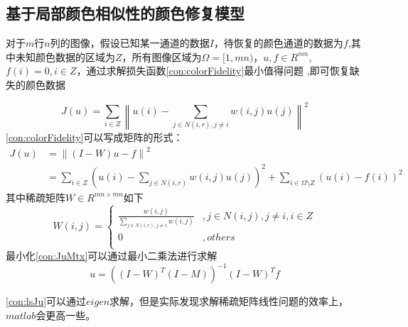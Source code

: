 \documentclass[UTF8]{ctexart}
\begin{document}
\begin{sloppypar}
    \subsection{基于局部颜色相似性的颜色修复模型}
    对于$m$行$n$列的图像，假设已知某一通道的数据$I$，待恢复的颜色通道的数据为$f$,其中未知颜色数据的区域为$Z$，所有图像区域为$\Omega=[1,mn)$，$u,f\in R^{mn}$,$f(i) = 0,i \in Z $，通过求解损失函数\eqref{con:colorFidelity}最小值得问题 ,即可恢复缺失的颜色数据\par
    \begin{equation}
        J(u) = \sum\limits_{i\in Z} \left\| u(i) - \sum\limits_{j\in N(i,r),j\neq i}w(i,j)u(j) \right\|^2
        \label{con:colorFidelity}
    \end{equation}
    \eqref{con:colorFidelity}可以写成矩阵的形式：
    \begin{equation}
        \begin{aligned}
            J(u) &= \left\| \left( I - W \right) u - f \right\|^2\\
                 &= \sum\limits_{i\in Z}\left(  u(i)-\sum\limits_{j\in N(i,r)}w(i,j)u(j)\right)^2 + \sum\limits_{i\in \Omega\setminus Z}(u(i) - f(i))^2
            \label{con:JuMtx}
        \end{aligned}
    \end{equation}
    其中稀疏矩阵$W\in R^{mn\times mn}$如下
    \begin{equation}
        W(i,j) = \left\{
        \begin{array}{cc}
            \frac{w(i,j)}{\sum\limits_{j\in N(i,r),j\neq i}w(i,j)}&,j \in N(i,j),j \neq i, i\in Z\\
           0&, others\\
        \end{array} \right.
        \label{con:W}
    \end{equation}
    最小化\eqref{con:JuMtx}可以通过最小二乘法进行求解
    \begin{equation}
        u = \left( (I-W)^T(I-M) \right)^{-1}\left( I-W \right)^Tf
        \label{con:lsJu}
    \end{equation}\par
    \eqref{con:lsJu}可以通过$eigen$求解，但是实际发现求解稀疏矩阵线性问题的效率上，$matlab$会更高一些。\par

\end{sloppypar}
\end{document}
